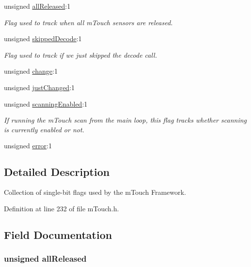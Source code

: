 \begin{DoxyCompactItemize}
unsigned \hyperlink{structm_touch___state_a534f5559db0181635e45a781dc1f0d45}{all\+Released}\+:1
\begin{DoxyCompactList}\small\item\em Flag used to track when all m\+Touch sensors are released. \end{DoxyCompactList}\item 
unsigned \hyperlink{structm_touch___state_a5bc7c6dc7f7d0fb027257c8911a0deba}{skipped\+Decode}\+:1
\begin{DoxyCompactList}\small\item\em Flag used to track if we just skipped the decode call. \end{DoxyCompactList}\item 
unsigned \hyperlink{structm_touch___state_a61dd6125b007d7733bc098cb13c056d3}{change}\+:1
\item 
unsigned \hyperlink{structm_touch___state_abae066f8affc6afd4e968ed87dc1073f}{just\+Changed}\+:1
\item 
unsigned \hyperlink{structm_touch___state_a0e6f752c8d598d33da2440d70b8acd76}{scanning\+Enabled}\+:1
\begin{DoxyCompactList}\small\item\em If running the m\+Touch scan from the main loop, this flag tracks whether scanning is currently enabled or not. \end{DoxyCompactList}\item 
unsigned \hyperlink{structm_touch___state_aa25790aaf38769a83aeb3bf66ba2adc3}{error}\+:1
\end{DoxyCompactItemize}


\subsection{Detailed Description}
Collection of single-\/bit flags used by the m\+Touch Framework. 

Definition at line 232 of file m\+Touch.\+h.



\subsection{Field Documentation}
\hypertarget{structm_touch___state_a534f5559db0181635e45a781dc1f0d45}{}
\subsubsection[{all\+Released}]{\setlength{\rightskip}{0pt plus 5cm}unsigned all\+Released}\label{structm_touch___state_a534f5559db0181635e45a781dc1f0d45}


